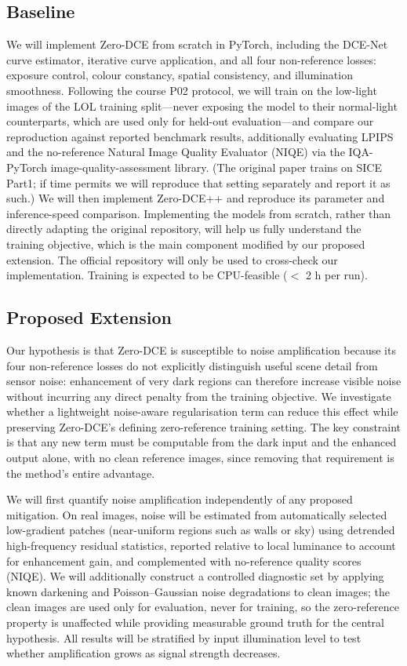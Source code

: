 \documentclass[11pt, letterpaper]{article}
\begin{document}
\subsection{Baseline}

We will implement Zero-DCE from scratch in PyTorch, including the DCE-Net curve estimator, iterative curve application, and all four non-reference losses: exposure control, colour constancy, spatial consistency, and illumination smoothness. Following the course P02 protocol, we will train on the low-light images of the LOL training split---never exposing the model to their normal-light counterparts, which are used only for held-out evaluation---and compare our reproduction against reported benchmark results, additionally evaluating LPIPS and the no-reference Natural Image Quality Evaluator (NIQE) via the IQA-PyTorch image-quality-assessment library. (The original paper trains on SICE Part1; if time permits we will reproduce that setting separately and report it as such.) We will then implement Zero-DCE++ and reproduce its parameter and inference-speed comparison. Implementing the models from scratch, rather than directly adapting the original repository, will help us fully understand the training objective, which is the main component modified by our proposed extension. The official repository will only be used to cross-check our implementation. Training is expected to be CPU-feasible ($<$ 2 h per run).

\subsection{Proposed Extension}

Our hypothesis is that Zero-DCE is susceptible to noise amplification because its four non-reference losses do not explicitly distinguish useful scene detail from sensor noise: enhancement of very dark regions can therefore increase visible noise without incurring any direct penalty from the training objective. We investigate whether a lightweight noise-aware regularisation term can reduce this effect while preserving Zero-DCE's defining zero-reference training setting. The key constraint is that any new term must be computable from the dark input and the enhanced output alone, with no clean reference images, since removing that requirement is the method's entire advantage.

We will first quantify noise amplification independently of any proposed mitigation. On real images, noise will be estimated from automatically selected low-gradient patches (near-uniform regions such as walls or sky) using detrended high-frequency residual statistics, reported relative to local luminance to account for enhancement gain, and complemented with no-reference quality scores (NIQE). We will additionally construct a controlled diagnostic set by applying known darkening and Poisson--Gaussian noise degradations to clean images; the clean images are used only for evaluation, never for training, so the zero-reference property is unaffected while providing measurable ground truth for the central hypothesis. All results will be stratified by input illumination level to test whether amplification grows as signal strength decreases.
\end{document}
